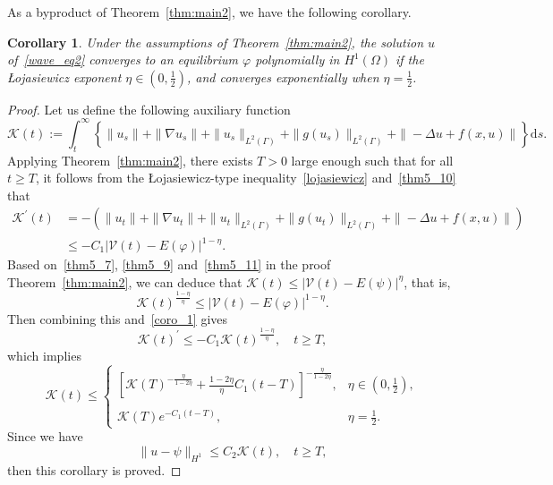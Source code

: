 \documentclass{elsarticle}
\newtheorem{corollary}{Corollary}[section]
\begin{document}
As a byproduct of Theorem~\ref{thm:main2}, we have the following corollary. 
\begin{corollary}
Under the assumptions of Theorem~\ref{thm:main2}, the solution $u$ of~\eqref{wave_eq2} converges to an equilibrium $\varphi$ polynomially in $H^1(\Omega)$ if the {\L}ojasiewicz exponent $\eta\in(0, \frac{1}{2})$, and converges exponentially when $\eta =\frac{1}{2}$.
\end{corollary}
\begin{proof}
Let us define the following auxiliary function
\[
	\mathcal{K}(t):=\int_{t}^{\infty}\left\{\|u_s\| + \|\nabla u_s\|+\|u_s\|_{L^{2}(\Gamma)}+\|g(u_s)\|_{L^{2}(\Gamma)}+ \|-\Delta u+f(x, u)\|\right\}\mathrm{d}s.
\]
Applying Theorem~\ref{thm:main2}, there exists $T>0$ large enough such that for all $t\geqslant T$, it follows from the {\L}ojasiewicz-type inequality~\eqref{lojasiewicz} and~\eqref{thm5_10} that
\begin{equation}
\begin{split}
	\mathcal{K}^{\prime}(t)&=-\left(\|u_t\| + \|\nabla u_t\|+\|u_t\|_{L^{2}(\Gamma)}+\|g(u_t)\|_{L^{2}(\Gamma)}+ \|-\Delta u+f(x, u)\| \right)\\
			&\leq -C_1|\mathcal{V}(t)-E(\varphi)|^{1-\eta}. \label{coro_1}
\end{split}
\end{equation}
Based on~\eqref{thm5_7}, \eqref{thm5_9} and~\eqref{thm5_11} in the proof Theorem~\ref{thm:main2}, we can deduce that $\mathcal{K}(t)\leq |\mathcal{V}(t)-E(\psi)|^{\eta}$, that is, 
\[
	\mathcal{K}(t)^{\frac{1-\eta}{\eta} }\leq |\mathcal{V}(t)-E(\varphi)|^{1-\eta}.
\]
Then combining this and~\eqref{coro_1} gives
\[
	\mathcal{K}(t)^{\prime}\leq -C_1\mathcal{K}(t)^{\frac{1-\eta}{\eta} }, \quad t\geqslant T,
\]
which implies
\begin{equation*}
\mathcal{K}(t) \leqslant
\left
    \{
        \begin{array}{ll}
		\left[\mathcal{K}(T)^{-\frac{\eta}{1-2\eta}} + \frac{1-2\eta}{\eta}C_1(t-T)\right]^{-\frac{\eta}{1-2\eta}}, & \eta \in (0, \frac{1}{2}),\\
		\\
		\mathcal{K}(T) e^{-C_1 (t-T)},& \eta=\frac{1}{2}.
        \end{array}
\right.
\end{equation*}
Since we have
\[
	\| u -\psi \|_{H^1}\leq C_2 \mathcal{K}(t), \quad t\geqslant T,
\]
then this corollary is proved. 
\end{proof}
\end{document}
